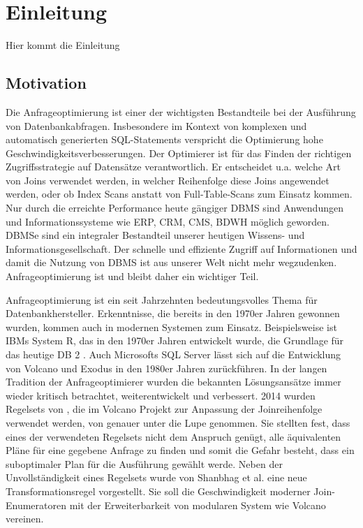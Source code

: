 \chapter{Einleitung}


Hier kommt die Einleitung





\section{Motivation}


Die Anfrageoptimierung ist einer der wichtigsten Bestandteile bei der Ausführung von Datenbankabfragen. Insbesondere im Kontext von komplexen und automatisch generierten SQL-Statements verspricht die Optimierung hohe Geschwindigkeitsverbesserungen. Der Optimierer ist für das Finden der richtigen Zugriffsstrategie auf Datensätze verantwortlich. Er entscheidet u.a. welche Art von Joins verwendet werden, in welcher Reihenfolge diese Joins angewendet werden, oder ob Index Scans anstatt von Full-Table-Scans zum Einsatz kommen. Nur durch die erreichte Performance heute gängiger \ac{DBMS} sind Anwendungen und Informationssysteme wie \ac{ERP}, \ac{CRM}, \ac{CMS}, \ac{BDWH} möglich geworden. \ac{DBMS}e sind ein integraler Bestandteil unserer heutigen Wissens- und Informationsgesellschaft. Der schnelle und effiziente Zugriff auf Informationen und damit die Nutzung von \ac{DBMS} ist aus unserer Welt nicht mehr wegzudenken. Anfrageoptimierung ist und bleibt daher ein wichtiger Teil.

Anfrageoptimierung ist ein seit Jahrzehnten bedeutungsvolles Thema für Datenbankhersteller. Erkenntnisse, die bereits in den 1970er Jahren gewonnen wurden, kommen auch in modernen Systemen zum Einsatz. Beispielsweise ist IBMs System R, das in den 1970er Jahren entwickelt wurde, die Grundlage für das heutige DB 2  \cite{wade2012ibm}. Auch Microsofts SQL Server lässt sich auf die Entwicklung von Volcano und Exodus in den 1980er Jahren zurückführen.
In der langen Tradition der Anfrageoptimierer wurden die bekannten Lösungsansätze immer wieder kritisch betrachtet, weiterentwickelt und verbessert. 2014 wurden Regelsets von \cite{pellenkoft1997complexity}, die im Volcano Projekt zur Anpassung der Joinreihenfolge verwendet werden, von \cite{shanbhag2014optimizing} genauer unter die Lupe genommen. 
Sie stellten fest, dass eines der verwendeten Regelsets nicht dem Anspruch genügt, alle äquivalenten Pläne für eine gegebene Anfrage zu finden und somit die Gefahr besteht, dass ein suboptimaler Plan für die Ausführung gewählt werde. Neben der Unvollständigkeit eines Regelsets wurde von Shanbhag et al. eine neue Transformationsregel vorgestellt. Sie soll die Geschwindigkeit moderner Join-Enumeratoren mit der Erweiterbarkeit von modularen System wie Volcano vereinen.

